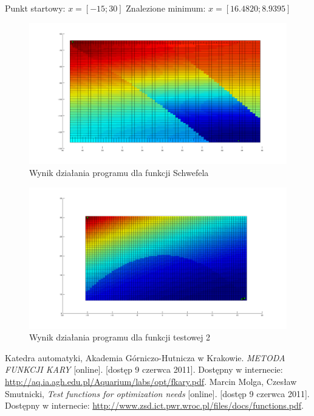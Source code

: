 \documentclass{classrep}
\begin{document}
Punkt startowy: $x = [-15; 30]$
Znalezione minimum: $x = [16.4820; 8.9395]$

\begin{figure}
 \includegraphics[width=\linewidth]{schwefel}
 \caption{Wynik działania programu dla funkcji Schwefela}
\end{figure}

\begin{figure}
 \includegraphics[width=\linewidth]{test2}
 \caption{Wynik działania programu dla funkcji testowej 2}
\end{figure}

\begin{thebibliography}{99}
Katedra automatyki, Akademia Górniczo-Hutnicza w Krakowie. \textit{METODA FUNKCJI KARY} [online]. [dostęp 9 czerwca 2011]. Dostępny w internecie: \url{http://aq.ia.agh.edu.pl/Aquarium/labs/opt/fkary.pdf}.
Marcin Molga, Czesław Smutnicki, \textit{Test functions for optimization needs} [online]. [dostęp 9 czerwca 2011]. Dostępny w internecie: \url{http://www.zsd.ict.pwr.wroc.pl/files/docs/functions.pdf}.
\end{thebibliography}
\end{document}
